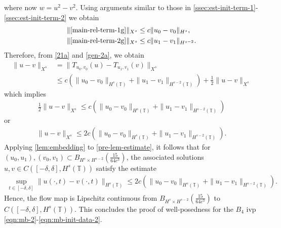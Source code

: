 \documentclass[12pt,reqno]{amsart}
\numberwithin{equation}{section}  %
\newcommand{\ci}{\mathbb{T}}
\begin{document}
%
where now $w = u^{2} - v^{2}$. Using arguments similar to those in 
\cref{ssec:est-init-term-1}-\cref{ssec:est-init-term-2}
we obtain
%
%
\begin{equation}
	\label{gen-2a}
	\begin{split}
    & \| \eqref{main-rel-term-1g}\|_{X^{s}}
		\le c \|u_0 -v_0\|_{H^s},
    \\
    & \| \eqref{main-rel-term-2g}\|_{X^{s}}
    \le c \|u_1 -v_1\|_{H^{s-2}}.
	\end{split}
\end{equation}
%
%
%
%
Therefore, from \eqref{21a} and \eqref{gen-2a}, we obtain
%
%
\begin{equation*}
	\begin{split}
    \|u -v \|_{X^{s}}
    & = \|T_{u_0, v_0}(u) - T_{u_1, v_1}(v) \|_{X^{s}}
    \\
    & \le
    c \left( \|u_0 -v_0 \|_{H^s\left( \ci \right)} +\|u_1 -v_1
        \|_{H^{s-2}\left( \ci \right)} \right )
        + \frac{1}{2} \|u -v \|_{X^{s}}
  \end{split}
\end{equation*}
%
%
which implies
%
%
\begin{equation*}
	\begin{split}
		\frac{1}{2} \|u-v\|_{X^{s}} \le
    c \left( \|u_0 -v_0 \|_{H^s\left( \ci \right)} +\|u_1 -v_1
        \|_{H^{s-2}\left( \ci \right)} \right )
      \end{split}
\end{equation*}
%
%
or
%
%
\begin{equation}
	\begin{split}
		\|u -v \|_{X^{s}} \le 2 c \left( \|u_0 -v_0 \|_{H^s\left( \ci \right)} +\|u_1 -v_1
        \|_{H^{s-2}\left( \ci \right)} \right ).
	\end{split}
  \label{pre-lem-estimate}
\end{equation}
%
%
Applying  \cref{lem:embedding} to \eqref{pre-lem-estimate}, it follows that
for $(u_0, u_1), (v_0, v_1)  \subset
B_{H^{s} \times H^{s-2}} \left (\frac{15}{64c^{3}} \right )$, the
associated solutions $u, v \in C([-\delta, \delta], H^{s}(\ci))$ satisfy the estimate%
%
%
	 \begin{equation*}
		 \begin{split}
       \sup_{t \in [-\delta, \delta]} \|u(\cdot, t) -v(\cdot, t) \|_{H^s(\ci)} \le
      2 c \left( \|u_0 -v_0 \|_{H^s\left( \ci \right)} +\|u_1 -v_1
        \|_{H^{s-2}\left( \ci \right)} \right ).
		 \end{split}
	 \end{equation*}
Hence, the flow map is Lipschitz continuous from $B_{H^{s}
\times H^{s-2}} \left (\frac{15}{64c^{3}} \right )$ to $C([-\delta, \delta],
H^{s}(\ci))$. This
concludes the proof of well-posedness for the $B_4$ ivp
\eqref{eqn:mb-2}-\eqref{eqn:mb-init-data-2}. \qquad \qedsymbol
%
%
%
%
%
%
%
\end{document}
